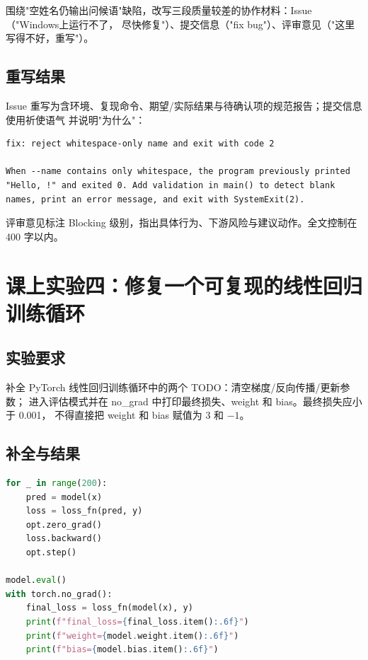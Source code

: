 \documentclass[UTF8]{ctexart}
\begin{document}
围绕"空姓名仍输出问候语"缺陷，改写三段质量较差的协作材料：Issue（"Windows上运行不了，
尽快修复"）、提交信息（"fix bug"）、评审意见（"这里写得不好，重写"）。

\subsection{重写结果}

Issue 重写为含环境、复现命令、期望/实际结果与待确认项的规范报告；提交信息使用祈使语气
并说明"为什么"：

\begin{lstlisting}
fix: reject whitespace-only name and exit with code 2

When --name contains only whitespace, the program previously printed
"Hello, !" and exited 0. Add validation in main() to detect blank
names, print an error message, and exit with SystemExit(2).
\end{lstlisting}

评审意见标注 Blocking 级别，指出具体行为、下游风险与建议动作。全文控制在 400 字以内。


\section{课上实验四：修复一个可复现的线性回归训练循环}

\subsection{实验要求}

补全 PyTorch 线性回归训练循环中的两个 TODO：清空梯度/反向传播/更新参数；
进入评估模式并在 no\_grad 中打印最终损失、weight 和 bias。最终损失应小于 0.001，
不得直接把 weight 和 bias 赋值为 3 和 $-1$。

\subsection{补全与结果}

\begin{lstlisting}[language=Python]
for _ in range(200):
    pred = model(x)
    loss = loss_fn(pred, y)
    opt.zero_grad()
    loss.backward()
    opt.step()

model.eval()
with torch.no_grad():
    final_loss = loss_fn(model(x), y)
    print(f"final_loss={final_loss.item():.6f}")
    print(f"weight={model.weight.item():.6f}")
    print(f"bias={model.bias.item():.6f}")
\end{lstlisting}
\end{document}
